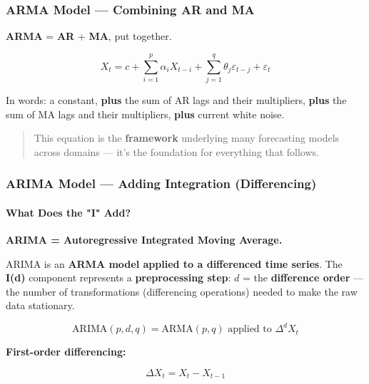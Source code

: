 \documentclass[12pt,openany]{book}
\begin{document}
\subsubsection{ARMA Model --- Combining AR and MA}

\textbf{ARMA} = \textbf{AR} + \textbf{MA}, put together.

\begin{equation*}
    X_t = c + \sum_{i=1}^{p}\alpha_i X_{t-i} + \sum_{j=1}^{q}\theta_j \varepsilon_{t-j} + \varepsilon_t
\end{equation*}

In words: a constant, \textbf{plus} the sum of AR lags and their multipliers, \textbf{plus} the sum of MA lags and their multipliers, \textbf{plus} current white noise.

\begin{quote}
This equation is the \textbf{framework} underlying many forecasting models across domains --- it's the foundation for everything that follows.\par

\end{quote}

\subsubsection{ARIMA Model --- Adding Integration (Differencing)}

\paragraph{What Does the "I" Add?}

\textbf{ARIMA = Autoregressive Integrated Moving Average.}

ARIMA is an \textbf{ARMA model applied to a differenced time series}. The \textbf{I(d)} component represents a \textbf{preprocessing step}: \(d\) = the \textbf{difference order} --- the number of transformations (differencing operations) needed to make the raw data stationary.

\begin{equation*}
    \text{ARIMA}(p, d, q) = \text{ARMA}(p, q) \text{ applied to } \Delta^d X_t
\end{equation*}

\textbf{First-order differencing:}

\begin{equation*}
    \Delta X_t = X_t - X_{t-1}
\end{equation*}
\end{document}
